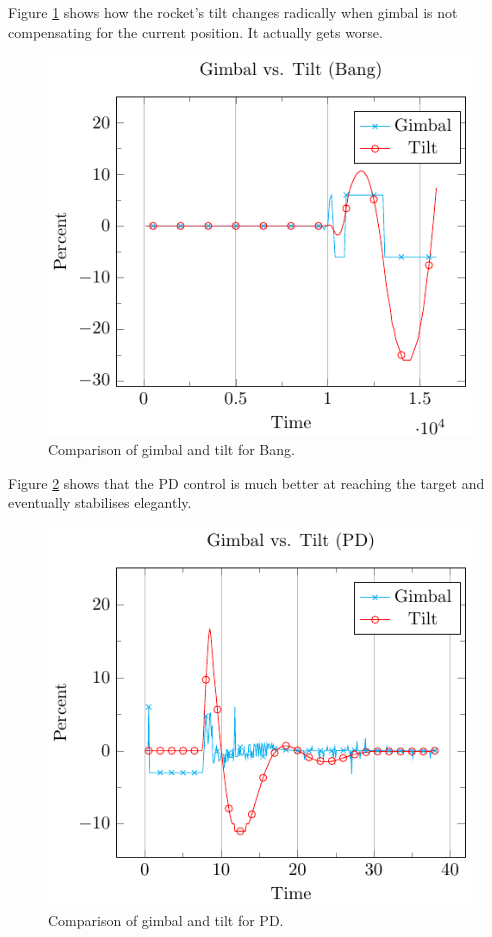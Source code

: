 \documentclass[
]{dtuposter}
\begin{document}
\begin{dtupostercontent}
Figure \ref{fig:tilt} shows how the rocket's tilt changes radically when gimbal is not compensating for the current position.
It actually gets worse.

\begin{figure}
  \includegraphics[width=\linewidth,origin=c]{tilt.pdf}
  \caption{Comparison of gimbal and tilt for Bang.}
  \label{fig:tilt}
\end{figure}

Figure \ref{fig:gimbal} shows that the PD control is much better at reaching the target and eventually stabilises elegantly.

\begin{figure}
  \includegraphics[width=\linewidth,origin=c]{gimbal.pdf}
  \caption{Comparison of gimbal and tilt for PD.}
  \label{fig:gimbal}
\end{figure}


\end{dtupostercontent}
\end{document}
